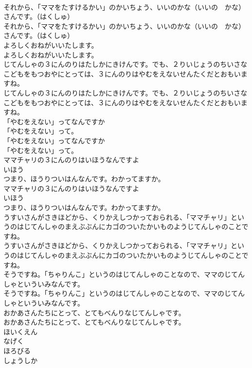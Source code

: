\documentclass[8pt]{extreport}
\begin{document}
\begin{CJK}{UTF8}{min}
\\	それから、「ママをたすけるかい」のかいちょう、いいのかな（いいの　かな）さんです。（はくしゅ）
\\	それから、「ママをたすけるかい」のかいちょう、いいのかな（いいの　かな）さんです。（はくしゅ）
\\	よろしくおねがいいたします。
\\	よろしくおねがいいたします。
\\	じてんしゃの３にんのりはたしかにきけんです。でも、２りいじょうのちいさなこどもをもつおやにとっては、３にんのりはやむをえないせんたくだとおもいますね。
\\	じてんしゃの３にんのりはたしかにきけんです。でも、２りいじょうのちいさなこどもをもつおやにとっては、３にんのりはやむをえないせんたくだとおもいますね。
\\	「やむをえない」ってなんですか
\\	「やむをえない」って。
\\	「やむをえない」ってなんですか
\\	「やむをえない」って。
\\	ママチャリの３にんのりはいほうなんですよ
\\	いほう
\\	つまり、ほうりついはんなんです。わかってますか。
\\	ママチャリの３にんのりはいほうなんですよ
\\	いほう
\\	つまり、ほうりついはんなんです。わかってますか。
\\	うすいさんがさきほどから、くりかえしつかっておられる、「ママチャリ」というのはじてんしゃのまえぶぶんにカゴのついたかいものようじてんしゃのことですね。
\\	うすいさんがさきほどから、くりかえしつかっておられる、「ママチャリ」というのはじてんしゃのまえぶぶんにカゴのついたかいものようじてんしゃのことですね。
\\	そうですね。「ちゃりんこ」というのはじてんしゃのことなので、ママのじてんしゃといういみなんです。
\\	そうですね。「ちゃりんこ」というのはじてんしゃのことなので、ママのじてんしゃといういみなんです。
\\	おかあさんたちにとって、とてもべんりなじてんしゃです。
\\	おかあさんたちにとって、とてもべんりなじてんしゃです。
\\	ほいくえん
\\	なげく
\\	ほろびる
\\	しょうしか

\end{CJK}
\end{document}
